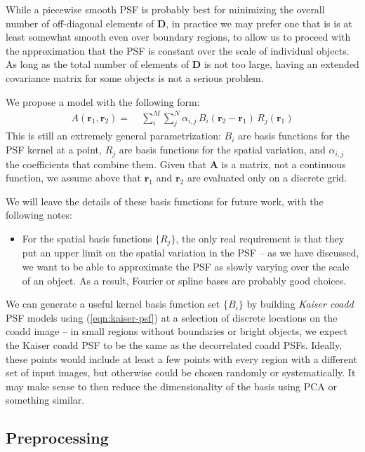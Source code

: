 \documentclass[10pt]{article}
\newcommand{\eqnref}[1]{(\ref{eqn:#1})}
\begin{document}
While a piecewise smooth PSF is probably best for minimizing the overall number of off-diagonal elements of $\bm{D}$, in practice we may prefer one that is is at least somewhat smooth even over boundary regions, to allow us to proceed with the approximation that the PSF is constant over the scale of individual objects.  As long as the total number of elements of $\bm{D}$ is not too large, having an extended covariance matrix for some objects is not a serious problem.

We propose a model with the following form:
\begin{align}
    A(\bm{r}_1,\bm{r}_2) =\;&
        \sum_i^M \sum_j^N \alpha_{i,j} \,
            B_i(\bm{r}_2-\bm{r}_1) \, R_j(\bm{r}_1)
\end{align}
This is still an extremely general parametrization: $B_i$ are basis functions for the PSF kernel at a point, $R_j$ are basis functions for the spatial variation, and $\alpha_{i,j}$ the coefficients that combine them.  Given that $\bm{A}$ is a matrix, not a continuous function, we assume above that $\bm{r}_1$ and $\bm{r}_2$ are evaluated only on a discrete grid.

We will leave the details of these basis functions for future work, with the following notes:
\begin{itemize}
\item For the spatial basis functions $\{R_j\}$, the only real requirement is that they put an upper limit on the spatial variation in the PSF -- as we have discussed, we want to be able to approximate the PSF as slowly varying over the scale of an object.  As a result, Fourier or spline bases are probably good choices.
\end{itemize}

We can generate a useful kernel basis function set $\{B_i\}$ by building \emph{Kaiser coadd} PSF models using \eqnref{kaiser-psf} at a selection of discrete locations on the coadd image -- in small regions without boundaries or bright objects, we expect the Kaiser coadd PSF to be the same as the decorrelated coadd PSFs.  Ideally, these points would include at least a few points with every region with a different set of input images, but otherwise could be chosen randomly or systematically.  It may make sense to then reduce the dimensionality of the basis using PCA or something similar.


\subsection{Preprocessing}



\end{document}
